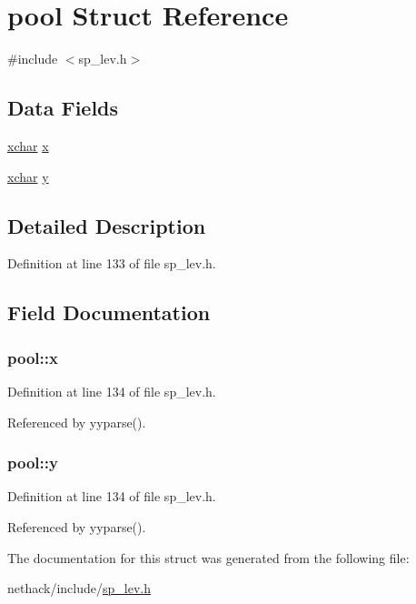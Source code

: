 \hypertarget{structpool}{\section{pool Struct Reference}
\label{structpool}
}


{\ttfamily \#include $<$sp\+\_\+lev.\+h$>$}

\subsection*{Data Fields}
\begin{DoxyCompactItemize}
\item 
\hyperlink{global_8h_a2043b7d01ce89f4ee2fa6c345a752d32}{xchar} \hyperlink{structpool_a5a1a80afb596115de6fc168a01d46c98}{x}
\item 
\hyperlink{global_8h_a2043b7d01ce89f4ee2fa6c345a752d32}{xchar} \hyperlink{structpool_a202ad40915dccb662447c4278484cb78}{y}
\end{DoxyCompactItemize}


\subsection{Detailed Description}


Definition at line 133 of file sp\+\_\+lev.\+h.



\subsection{Field Documentation}
\hypertarget{structpool_a5a1a80afb596115de6fc168a01d46c98}{
\subsubsection[{x}]{ pool\+::x}}\label{structpool_a5a1a80afb596115de6fc168a01d46c98}


Definition at line 134 of file sp\+\_\+lev.\+h.



Referenced by yyparse().

\hypertarget{structpool_a202ad40915dccb662447c4278484cb78}{
\subsubsection[{y}]{ pool\+::y}}\label{structpool_a202ad40915dccb662447c4278484cb78}


Definition at line 134 of file sp\+\_\+lev.\+h.



Referenced by yyparse().



The documentation for this struct was generated from the following file\+:\begin{DoxyCompactItemize}
\item 
nethack/include/\hyperlink{sp__lev_8h}{sp\+\_\+lev.\+h}\end{DoxyCompactItemize}
